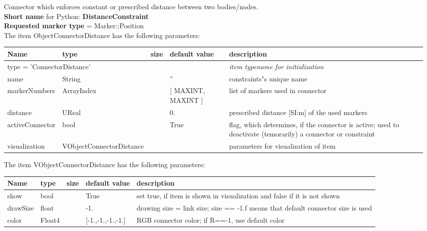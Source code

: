 Connector which enforces constant or prescribed distance between two bodies/nodes.
 \\
{\bf Short name} for Python: {\bf DistanceConstraint}
 \\  {\bf Requested marker type} = Marker::Position \\ 
The item ObjectConnectorDistance has the following parameters:
\begin{center}
  \footnotesize
  \begin{longtable}{| p{4.5cm} | p{2.5cm} | p{0.5cm} | p{2.5cm} | p{6cm} |}
    \hline
    \bf Name & \bf type & \bf size & \bf default value & \bf description \\ \hline
    \multicolumn{4}{l}{\parbox{10cm}{type = 'ConnectorDistance'}} & \multicolumn{1}{l}{\parbox{6cm}{\it item typename for initialization}}\\ \hline
    name &     String &      &     '' &     constraints"s unique name\\ \hline
    markerNumbers &     ArrayIndex &      &     [ MAXINT, MAXINT ] &     list of markers used in connector\\ \hline
    distance &     UReal &      &     0. &     prescribed distance [SI:m] of the used markers\\ \hline
    activeConnector &     bool &      &     True &     flag, which determines, if the connector is active; used to deactivate (temorarily) a connector or constraint\\ \hline
    visualization & VObjectConnectorDistance & & & parameters for visualization of item \\ \hline
	  \end{longtable}
	\end{center}
The item VObjectConnectorDistance has the following parameters:
\begin{center}
  \footnotesize
  \begin{longtable}{| p{4.5cm} | p{2.5cm} | p{0.5cm} | p{2.5cm} | p{6cm} |}
    \hline
    \bf Name & \bf type & \bf size & \bf default value & \bf description \\ \hline
    show &     bool &      &     True &     set true, if item is shown in visualization and false if it is not shown\\ \hline
    drawSize &     float &      &     -1. &     drawing size = link size; size == -1.f means that default connector size is used\\ \hline
    color &     Float4 &      &     [-1.,-1.,-1.,-1.] &     RGB connector color; if R==-1, use default color\\ \hline
	  \end{longtable}
	\end{center}


